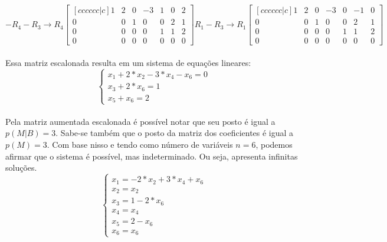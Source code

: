 \[
    -R_4-R_3\to R_4
    \begin{bmatrix}[cccccc|c]
        1 & 2 & 0 & -3 & 1 & 0 & 2 \\
        0 & 0 & 1 & 0  & 0 & 2 & 1 \\
        0 & 0 & 0 & 0  & 1 & 1 & 2 \\
        0 & 0 & 0 & 0  & 0 & 0 & 0
    \end{bmatrix}
    R_1-R_3\to R_1
    \begin{bmatrix}[cccccc|c]
        1 & 2 & 0 & -3 & 0 & -1 & 0 \\
        0 & 0 & 1 & 0  & 0 & 2  & 1 \\
        0 & 0 & 0 & 0  & 1 & 1  & 2 \\
        0 & 0 & 0 & 0  & 0 & 0  & 0
    \end{bmatrix}
\]
\\

Essa matriz escalonada resulta em um sistema de equações lineares:
\\

\[
    \begin{cases}
        x_1 +2*x_2  -3*x_4 -x_6  = 0 \\
        x_3  +2*x_6 = 1              \\
        x_5 +x_6 = 2
    \end{cases}
\]
\\

Pela matriz aumentada escalonada é possível notar que seu posto é igual a $p(M|B)=3$. Sabe-se também que o posto da matriz dos coeficientes é igual a $p(M)=3$. Com base nisso e tendo como número de variáveis $n=6$, podemos afirmar que o sistema é possível, mas indeterminado. Ou seja, apresenta infinitas soluções.\\

\begin{equation}
    \begin{cases}
        x_1=-2*x_2+3*x_4+x_6 \\
        x_2=x_2              \\
        x_3=1-2*x_6          \\
        x_4=x_4              \\
        x_5=2-x_6            \\
        x_6=x_6
    \end{cases}
\end{equation}
